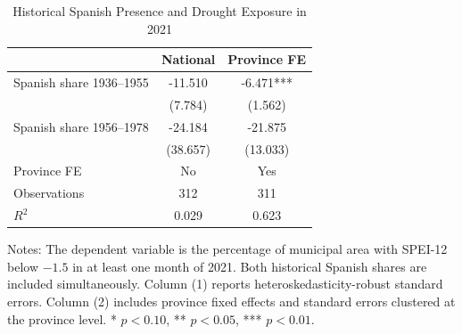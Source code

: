 \begin{table}[!htbp]
\caption{Historical Spanish Presence and Drought Exposure in 2021}
\centering
\small
\renewcommand{\arraystretch}{1.15}
\setlength{\tabcolsep}{8pt}
\begin{tabular}{lcc}
\hline
 & National & Province FE \\
\hline
Spanish share 1936--1955 & -11.510 & -6.471*** \\
 & (7.784) & (1.562) \\
Spanish share 1956--1978 & -24.184 & -21.875 \\
 & (38.657) & (13.033) \\
Province FE & No & Yes \\

Observations & 312 & 311 \\
$R^2$ & 0.029 & 0.623 \\
\hline
\end{tabular}

\vspace{0.2cm}
\begin{minipage}{0.85\textwidth}
\footnotesize Notes: The dependent variable is the percentage of municipal area with SPEI-12 below $-1.5$ in at least one month of 2021. Both historical Spanish shares are included simultaneously. Column (1) reports heteroskedasticity-robust standard errors. Column (2) includes province fixed effects and standard errors clustered at the province level. * $p<0.10$, ** $p<0.05$, *** $p<0.01$.
\end{minipage}
\end{table}
